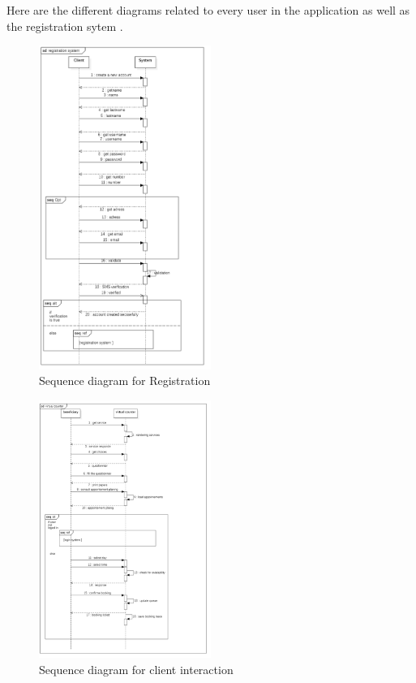 \medskip Here are the different diagrams related to every user in the application as well as the registration sytem . 
  \begin{figure}[H]
      \centering
      \includegraphics*[width=0.5\textwidth]{registration_sequence.PNG}
      \caption{Sequence diagram for Registration}
      \label{fig:Sequence diagram for Registration}
  \end{figure}
  \begin{figure}[H]
      \centering
      \includegraphics*[width=0.5\textwidth]{sequence_client.PNG}
      \caption{Sequence diagram for client interaction}
      \label{fig:Sequence diagram for Cient Interaction}
  \end{figure}
 
